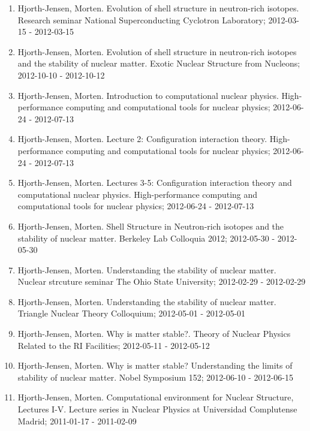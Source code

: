\documentclass[%
oneside,                 %
final,                   %
10pt]{article}
\begin{document}
\begin{enumerate}
\item Hjorth-Jensen, Morten.  Evolution of shell structure in neutron-rich isotopes. Research seminar National Superconducting Cyclotron Laboratory; 2012-03-15 - 2012-03-15

\item Hjorth-Jensen, Morten.  Evolution of shell structure in neutron-rich isotopes and the stability of nuclear matter. Exotic Nuclear Structure from Nucleons; 2012-10-10 - 2012-10-12

\item Hjorth-Jensen, Morten.  Introduction to computational nuclear physics. High-performance computing and computational tools for nuclear physics; 2012-06-24 - 2012-07-13

\item Hjorth-Jensen, Morten.  Lecture 2: Configuration interaction theory. High-performance computing and computational tools for nuclear physics; 2012-06-24 - 2012-07-13

\item Hjorth-Jensen, Morten.  Lectures 3-5: Configuration interaction theory and computational nuclear physics. High-performance computing and computational tools for nuclear physics; 2012-06-24 - 2012-07-13

\item Hjorth-Jensen, Morten.  Shell Structure in Neutron-rich isotopes and the stability of nuclear matter. Berkeley Lab Colloquia 2012; 2012-05-30 - 2012-05-30

\item Hjorth-Jensen, Morten.  Understanding the stability of nuclear matter. Nuclear strcuture seminar The Ohio State University; 2012-02-29 - 2012-02-29

\item Hjorth-Jensen, Morten.  Understanding the stability of nuclear matter. Triangle Nuclear Theory Colloquium; 2012-05-01 - 2012-05-01

\item Hjorth-Jensen, Morten.  Why is matter stable?. Theory of Nuclear Physics Related to the RI Facilities; 2012-05-11 - 2012-05-12

\item Hjorth-Jensen, Morten.  Why is matter stable? Understanding the limits of stability of nuclear matter. Nobel Symposium 152; 2012-06-10 - 2012-06-15

\item Hjorth-Jensen, Morten. Computational environment for Nuclear Structure, Lectures I-V. Lecture series in Nuclear Physics at Universidad Complutense Madrid; 2011-01-17 - 2011-02-09


\end{enumerate}
\end{document}
